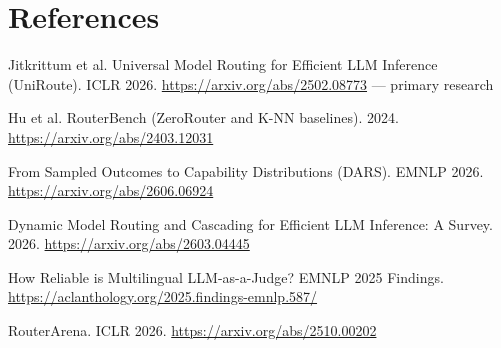 \documentclass[11pt,a4paper]{article}
\begin{document}
\section*{References}
\begin{enumerate}[label={[\arabic*]}]
  \item Jitkrittum et al. Universal Model Routing for Efficient LLM Inference (UniRoute). ICLR 2026. \url{https://arxiv.org/abs/2502.08773} --- primary research
  \item Hu et al. RouterBench (ZeroRouter and K-NN baselines). 2024. \url{https://arxiv.org/abs/2403.12031}
  \item From Sampled Outcomes to Capability Distributions (DARS). EMNLP 2026. \url{https://arxiv.org/abs/2606.06924}
  \item Dynamic Model Routing and Cascading for Efficient LLM Inference: A Survey. 2026. \url{https://arxiv.org/abs/2603.04445}
  \item How Reliable is Multilingual LLM-as-a-Judge? EMNLP 2025 Findings. \url{https://aclanthology.org/2025.findings-emnlp.587/}
  \item RouterArena. ICLR 2026. \url{https://arxiv.org/abs/2510.00202}
\end{enumerate}
\end{document}

